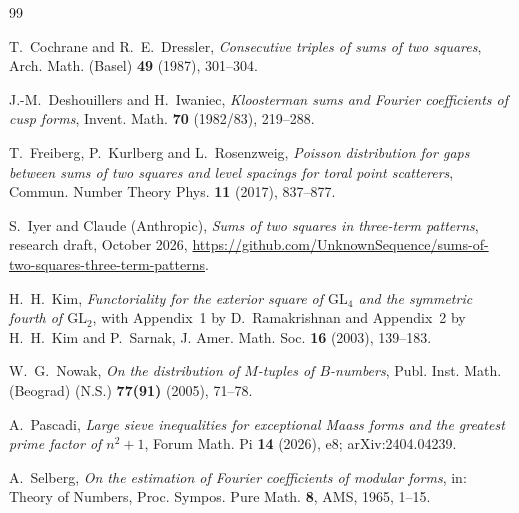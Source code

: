 \documentclass[11pt]{amsart}
\theoremstyle{remark}
\theoremstyle{definition}
\numberwithin{equation}{section}
\begin{document}
\begin{thebibliography}{99}

 T.~Cochrane and R.~E.~Dressler, \emph{Consecutive triples of sums of two squares}, Arch. Math. (Basel) \textbf{49} (1987), 301--304.

 J.-M.~Deshouillers and H.~Iwaniec, \emph{Kloosterman sums and Fourier coefficients of cusp forms}, Invent. Math. \textbf{70} (1982/83), 219--288.

 T.~Freiberg, P.~Kurlberg and L.~Rosenzweig, \emph{Poisson distribution for gaps between sums of two squares and level spacings for toral point scatterers}, Commun. Number Theory Phys. \textbf{11} (2017), 837--877.

 S.~Iyer and Claude (Anthropic), \emph{Sums of two squares in three-term patterns}, research draft, October 2026, \url{https://github.com/UnknownSequence/sums-of-two-squares-three-term-patterns}.

 H.~H.~Kim, \emph{Functoriality for the exterior square of $\mathrm{GL}_4$ and the symmetric fourth of $\mathrm{GL}_2$}, with Appendix~1 by D.~Ramakrishnan and Appendix~2 by H.~H.~Kim and P.~Sarnak, J. Amer. Math. Soc. \textbf{16} (2003), 139--183.

 W.~G.~Nowak, \emph{On the distribution of $M$-tuples of $B$-numbers}, Publ. Inst. Math. (Beograd) (N.S.) \textbf{77(91)} (2005), 71--78.

 A.~Pascadi, \emph{Large sieve inequalities for exceptional Maass forms and the greatest prime factor of $n^2+1$}, Forum Math. Pi \textbf{14} (2026), e8; arXiv:2404.04239.

 A.~Selberg, \emph{On the estimation of Fourier coefficients of modular forms}, in: Theory of Numbers, Proc. Sympos. Pure Math. \textbf{8}, AMS, 1965, 1--15.

\end{thebibliography}
\end{document}
